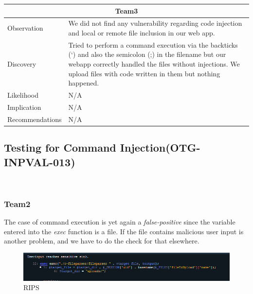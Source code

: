 \documentclass[headsepline,footsepline,footinclude=false,oneside,fontsize=11pt,paper=a4,listof=totoc,bibliography=totoc]{scrbook} %
\begin{document}
\begin{tabular}{ l|p{11cm}  }
	\hline
	\multicolumn{2}{c}{\textbf{Team3}} \\
	\hline
	Observation   & We did not find any vulnerability regarding code injection and local or remote file inclusion in our web app.   \\
	Discovery  & Tried to perform a command execution via the backticks (`) and also the semicolon (;) in the filename but our	webapp correctly handled the files without injections. We upload files with code written in them but nothing happened. \\
	Likelihood & N/A \\
	Implication    & N/A \\
	Recommendations & N/A \\ 
	\hline
\end{tabular}
\pagebreak
\subsection{Testing for Command Injection(OTG-INPVAL-013)}\
\subsubsection{Team2}
The case of command execution is yet again a \textit{false-positive} since the variable entered into the \textit{exec} function is a file. If the file contains malicious user input is another problem, and we have to do the check for that elsewhere.\\

\begin{figure}[H]
	\centering
	\includegraphics[width=150mm]{logos/command1.jpg}
	\caption{RIPS \label{overflow}}
\end{figure}
 
\pagebreak
\end{document}
